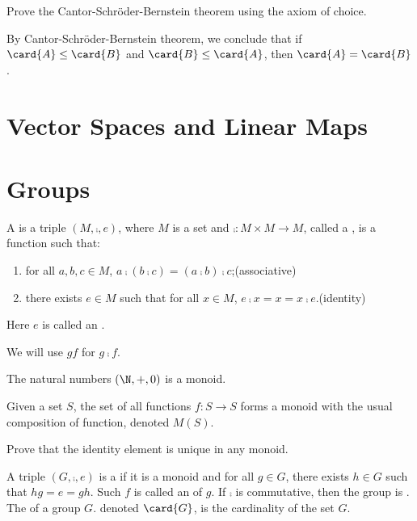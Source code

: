 \documentclass[10pt]{article}
\begin{document}
\begin{problem}
    Prove the Cantor-Schröder-Bernstein theorem using the axiom of choice.
\end{problem}
\par
By Cantor-Schröder-Bernstein theorem, we conclude that if $\card{A}\le\card{B}$ and $\card{B}\le\card{A}$, then $\card{A}=\card{B}$.

\newpage
\section{Vector Spaces and Linear Maps}

\newpage

 

\newpage
\section{Groups}
\begin{definition}
    A  is a triple $(M,\comp,e)$, where $M$ is a set and $\comp:M\times M\to M$, called a , is a function such that:
    \begin{enumerate}
        \item for all $a,b,c\in M$, $a\comp(b\comp c)=(a\comp b)\comp c$;\hfill(associative)
        \item there exists $e\in M$ such that for all $x\in M$, $e\comp x=x=x\comp e$.\hfill(identity)
    \end{enumerate}
    Here $e$ is called an .
\end{definition}
\begin{remark}
    We will use $gf$ for $g\comp f$.
\end{remark}
\begin{example}
    The natural numbers $(\N,+,0)$ is a monoid.
\end{example}
\begin{example}
    Given a set $S$, the set of all functions $f:S\to S$ forms a monoid with the usual composition of function, denoted $M(S)$.
\end{example}
\begin{problem}
    Prove that the identity element is unique in any monoid.
\end{problem}
\begin{definition}
    A triple $(G,\comp,e)$ is a  if it is a monoid and for all $g\in G$, there exists $h\in G$ such that $hg=e=gh$. Such $f$ is called an  of $g$. If $\comp$ is commutative, then the group is . The  of a group $G$. denoted $\card{G}$, is the cardinality of the set $G$.
\end{definition}
\end{document}
